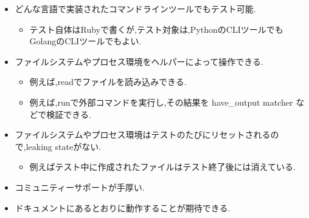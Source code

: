 \begin{itemize}
\item どんな言語で実装されたコマンドラインツールでもテスト可能.
\begin{itemize}
\item テスト自体はRubyで書くが,テスト対象は,PythonのCLIツールでもGolangのCLIツールでもよい.
\end{itemize}
\item ファイルシステムやプロセス環境をヘルパーによって操作できる.
\begin{itemize}
\item 例えば,readでファイルを読み込みできる.
\item 例えば,runで外部コマンドを実行し,その結果を have\_output matcher などで検証できる.
\end{itemize}
\item ファイルシステムやプロセス環境はテストのたびにリセットされるので,leaking stateがない.
\begin{itemize}
\item 例えばテスト中に作成されたファイルはテスト終了後には消えている.
\end{itemize}
\item コミュニティーサポートが手厚い.
\item ドキュメントにあるとおりに動作することが期待できる.
\end{itemize}
